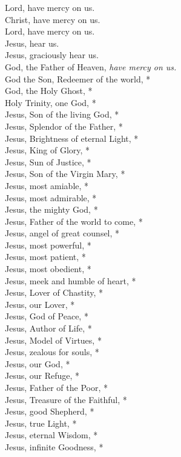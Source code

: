 \documentclass{article}
\begin{document}
\begin{multicols}{3}
Lord, have mercy on us.\\
Christ, have mercy on us.\\
Lord, have mercy on us.\\
Jesus, hear us.\\
Jesus, graciously hear us.\\
God, the Father of Heaven, \textit{have mercy on us.}\\
God the Son, Redeemer of the world, *\\
God, the Holy Ghost, *\\
Holy Trinity, one God, *\\
Jesus, Son of the living God, *\\
Jesus, Splendor of the Father, *\\
Jesus, Brightness of eternal Light, *\\
Jesus, King of Glory, *\\
Jesus, Sun of Justice, *\\
Jesus, Son of the Virgin Mary, *\\
Jesus, most amiable, *\\
Jesus, most admirable, *\\
Jesus, the mighty God, *\\
Jesus, Father of the world to come, *\\
Jesus, angel of great counsel, *\\
Jesus, most powerful, *\\
Jesus, most patient, *\\
Jesus, most obedient, *\\
Jesus, meek and humble of heart, *\\
Jesus, Lover of Chastity, *\\
Jesus, our Lover, *\\
Jesus, God of Peace, *\\
Jesus, Author of Life, *\\
Jesus, Model of Virtues, *\\
Jesus, zealous for souls, *\\
Jesus, our God, *\\
Jesus, our Refuge, *\\
Jesus, Father of the Poor, *\\
Jesus, Treasure of the Faithful, *\\
Jesus, good Shepherd, *\\
Jesus, true Light, *\\
Jesus, eternal Wisdom, *\\
Jesus, infinite Goodness, *\\

\end{multicols}
\end{document}
